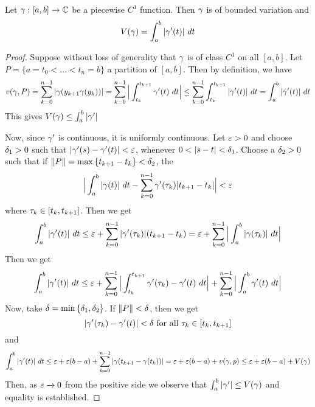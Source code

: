 \begin{theorem}\label{4.1.5}
    Let $\gamma:[a,b] \xrightarrow{} \mathbb{C}$ be a piecewise $C^1$ function. Then $\gamma$ is
    of bounded variation and
    \begin{equation*}
        V(\y)=\int_a^b{|\y'(t)| \ dt}
    \end{equation*}
\end{theorem}
\begin{proof}
    Suppose without loss of generality that $\gamma$ is of class $C^1$ on all
    $[a,b]$. Let $P=\{a=t_0<\dots<t_n=b\}$ a partition of $[a,b]$. Then by
    definition, we have
    \begin{equation*}
        v(\gamma,P)=\sum_{k=0}^{n-1}{|\gamma(y_{k+1}\gamma(y_k))|}=
        \sum_{k=0}^{n-1}{\Big{|} \int_{t_k}^{t_{k+1}}{\gamma'(t) \ dt} \Big{|}} \leq
        \sum_{k=0}^{n-1}{\int_{t_k}^{t_{k+1}}{|\gamma'(t)| \ dt}}=
        \int_a^b{|\gamma'(t)| \ dt}
    \end{equation*}
    This gives $V(\gamma) \leq \int_a^b{|\gamma'|}$

    Now, since $\gamma'$ is continuous, it is uniformly continuous. Let  $\varepsilon>0$ and
    choose  $\delta_1>0$ such that $|\gamma'(s)-\gamma'(t)|<\varepsilon$, whenever $0<|s-t|<\d_1$.
    Choose a $\delta_2>0$ such that if $\|P\|=\max{\{t_{k+1}-t_k\}}<\delta_2$, the
    \begin{equation*}
        \Big{|} \int_a^b{|\gamma(t)| \ dt}-
        \sum_{k=0}^{n-1}{\gamma'(\tau_k)}|t_{k+1}-t_k| \Big{|}<\varepsilon
    \end{equation*}
    where $\tau_k \in [t_k,t_{k+1}]$. Then we get
    \begin{equation*}
    \int_a^b{|\gamma'(t)| \ dt} \leq \varepsilon+\sum_{k=0}^{n-1}{|\gamma'(\tau_k)|(t_{k+1}-t_k)}=
    \varepsilon+\sum_{k=0}^{n-1}{\Big{|} \int_a^b{|\gamma(\tau_k)| \ dt} \Big{|}}
    \end{equation*}
    Then we get
    \begin{equation*}
        \int_a^b{|\gamma'(t)| \ dt} \leq
        \varepsilon+\sum_{k=0}^{n-1}{\Big{|} \int_{t_k}^{t_{k+1}}{\gamma'(\tau_k)-\gamma'(t) \ dt}\Big{|}}+
        \sum_{k=0}^{n-1}{\Big{|} \int_a^b{\gamma'(t) \ dt} \Big{|}}
    \end{equation*}
    Now, take $\delta=\min{\{\delta_1,\delta_2\}}$. If $\|P\|<\delta$, then we get
    \begin{equation*}
        |\gamma'(\tau_k)-\gamma'(t)|<\delta \text{ for all } \tau_k \in [t_k,t_{k+1}]
    \end{equation*}
    and
    \begin{equation*}
        \int_a^b{|\gamma'(t)| \ dt} \leq
        \varepsilon+\varepsilon(b-a)+\sum_{k=0}^{n-1}{|\gamma(t_{k+1}-\gamma(t_k))|}=\varepsilon+\varepsilon(b-a)+v(\gamma,p)
        \leq
        \varepsilon+\varepsilon(b-a)+V(\gamma)
    \end{equation*}
    Then, as $\varepsilon \xrightarrow{} 0$ from the positive side we observe that
    $\int_a^b{|\gamma'|} \leq V(\gamma)$ and equality is established.
\end{proof}

